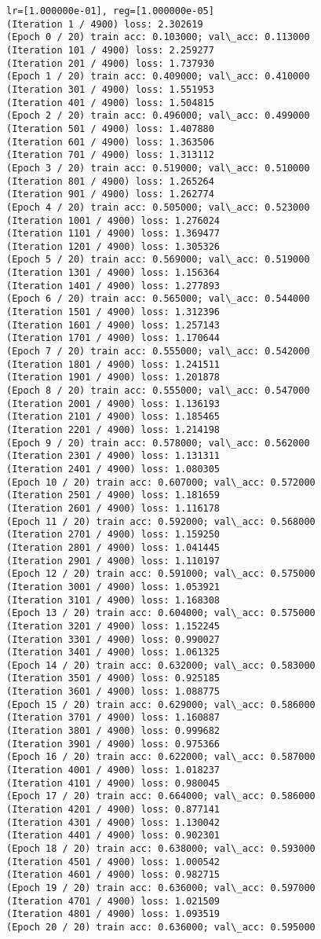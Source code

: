 \documentclass[11pt]{article}
\begin{document}
\begin{Verbatim}[commandchars=\\\{\}]
lr=[1.000000e-01], reg=[1.000000e-05]
(Iteration 1 / 4900) loss: 2.302619
(Epoch 0 / 20) train acc: 0.103000; val\_acc: 0.113000
(Iteration 101 / 4900) loss: 2.259277
(Iteration 201 / 4900) loss: 1.737930
(Epoch 1 / 20) train acc: 0.409000; val\_acc: 0.410000
(Iteration 301 / 4900) loss: 1.551953
(Iteration 401 / 4900) loss: 1.504815
(Epoch 2 / 20) train acc: 0.496000; val\_acc: 0.499000
(Iteration 501 / 4900) loss: 1.407880
(Iteration 601 / 4900) loss: 1.363506
(Iteration 701 / 4900) loss: 1.313112
(Epoch 3 / 20) train acc: 0.519000; val\_acc: 0.510000
(Iteration 801 / 4900) loss: 1.265264
(Iteration 901 / 4900) loss: 1.262774
(Epoch 4 / 20) train acc: 0.505000; val\_acc: 0.523000
(Iteration 1001 / 4900) loss: 1.276024
(Iteration 1101 / 4900) loss: 1.369477
(Iteration 1201 / 4900) loss: 1.305326
(Epoch 5 / 20) train acc: 0.569000; val\_acc: 0.519000
(Iteration 1301 / 4900) loss: 1.156364
(Iteration 1401 / 4900) loss: 1.277893
(Epoch 6 / 20) train acc: 0.565000; val\_acc: 0.544000
(Iteration 1501 / 4900) loss: 1.312396
(Iteration 1601 / 4900) loss: 1.257143
(Iteration 1701 / 4900) loss: 1.170644
(Epoch 7 / 20) train acc: 0.555000; val\_acc: 0.542000
(Iteration 1801 / 4900) loss: 1.241511
(Iteration 1901 / 4900) loss: 1.201878
(Epoch 8 / 20) train acc: 0.555000; val\_acc: 0.547000
(Iteration 2001 / 4900) loss: 1.136193
(Iteration 2101 / 4900) loss: 1.185465
(Iteration 2201 / 4900) loss: 1.214198
(Epoch 9 / 20) train acc: 0.578000; val\_acc: 0.562000
(Iteration 2301 / 4900) loss: 1.131311
(Iteration 2401 / 4900) loss: 1.080305
(Epoch 10 / 20) train acc: 0.607000; val\_acc: 0.572000
(Iteration 2501 / 4900) loss: 1.181659
(Iteration 2601 / 4900) loss: 1.116178
(Epoch 11 / 20) train acc: 0.592000; val\_acc: 0.568000
(Iteration 2701 / 4900) loss: 1.159250
(Iteration 2801 / 4900) loss: 1.041445
(Iteration 2901 / 4900) loss: 1.110197
(Epoch 12 / 20) train acc: 0.591000; val\_acc: 0.575000
(Iteration 3001 / 4900) loss: 1.053921
(Iteration 3101 / 4900) loss: 1.168308
(Epoch 13 / 20) train acc: 0.604000; val\_acc: 0.575000
(Iteration 3201 / 4900) loss: 1.152245
(Iteration 3301 / 4900) loss: 0.990027
(Iteration 3401 / 4900) loss: 1.061325
(Epoch 14 / 20) train acc: 0.632000; val\_acc: 0.583000
(Iteration 3501 / 4900) loss: 0.925185
(Iteration 3601 / 4900) loss: 1.088775
(Epoch 15 / 20) train acc: 0.629000; val\_acc: 0.586000
(Iteration 3701 / 4900) loss: 1.160887
(Iteration 3801 / 4900) loss: 0.999682
(Iteration 3901 / 4900) loss: 0.975366
(Epoch 16 / 20) train acc: 0.622000; val\_acc: 0.587000
(Iteration 4001 / 4900) loss: 1.018237
(Iteration 4101 / 4900) loss: 0.980045
(Epoch 17 / 20) train acc: 0.664000; val\_acc: 0.586000
(Iteration 4201 / 4900) loss: 0.877141
(Iteration 4301 / 4900) loss: 1.130042
(Iteration 4401 / 4900) loss: 0.902301
(Epoch 18 / 20) train acc: 0.638000; val\_acc: 0.593000
(Iteration 4501 / 4900) loss: 1.000542
(Iteration 4601 / 4900) loss: 0.982715
(Epoch 19 / 20) train acc: 0.636000; val\_acc: 0.597000
(Iteration 4701 / 4900) loss: 1.021509
(Iteration 4801 / 4900) loss: 1.093519
(Epoch 20 / 20) train acc: 0.636000; val\_acc: 0.595000


\end{Verbatim}
\end{document}
